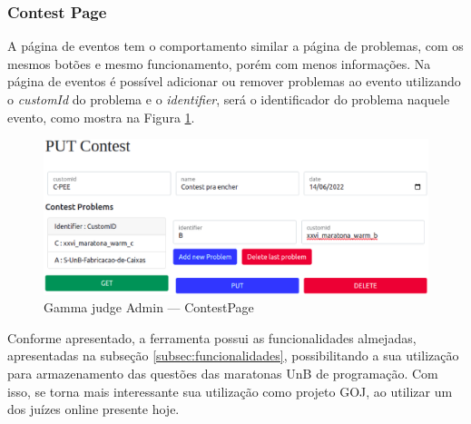 \subsubsection{Contest Page}

A página de eventos tem o comportamento similar a página de problemas, com os mesmos botões e mesmo funcionamento, porém com menos informações. Na página de eventos é possível adicionar ou remover problemas ao evento utilizando o \textit{customId} do problema e o \textit{identifier}, será o identificador do problema naquele evento, como mostra na Figura \ref{fig:judge_admin_contest}.

\begin{figure}[H]
    \centering
    \includegraphics[keepaspectratio=true,scale=0.45]{figuras/contest_page.eps}
    \caption{Gamma judge Admin — ContestPage}
    \label{fig:judge_admin_contest}
\end{figure}
Conforme apresentado, a ferramenta possui as funcionalidades almejadas, apresentadas na subseção \ref{subsec:funcionalidades}, possibilitando a sua utilização para armazenamento das questões das maratonas UnB de programação. Com isso, se torna mais interessante sua utilização como projeto GOJ, ao utilizar um dos juízes online presente hoje.
